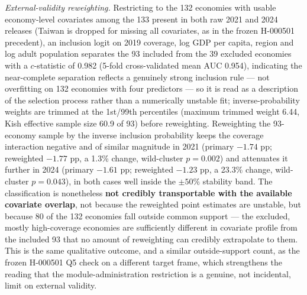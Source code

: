 \emph{External-validity reweighting.} Restricting to the 132 economies with usable
economy-level covariates among the 133 present in both raw 2021 and 2024 releases (Taiwan
is dropped for missing all covariates, as in the frozen H-000501 precedent), an inclusion
logit on 2019 coverage, log GDP per capita, region and log adult population separates the
93 included from the 39 excluded economies with a $c$-statistic of 0.982 (5-fold
cross-validated mean AUC 0.954), indicating the near-complete separation reflects a
genuinely strong inclusion rule --- not overfitting on 132 economies with four
predictors --- so it is read as a description of the selection process rather than a
numerically unstable fit; inverse-probability weights are trimmed at the 1st/99th
percentiles (maximum trimmed weight 6.44, Kish effective sample size 60.9 of 93) before
reweighting. Reweighting the
93-economy sample by the inverse inclusion probability keeps the coverage interaction
negative and of similar magnitude in 2021 (primary $-1.74$ pp; reweighted $-1.77$ pp, a
1.3\% change, wild-cluster $p=0.002$) and attenuates it further in 2024 (primary $-1.61$
pp; reweighted $-1.23$ pp, a 23.3\% change, wild-cluster $p=0.043$), in both cases well
inside the $\pm 50\%$ stability band. The classification is nonetheless
\textbf{not credibly transportable with the available covariate overlap}, not because the
reweighted point estimates are unstable, but
because 80 of the 132 economies fall outside common support --- the excluded, mostly
high-coverage economies are sufficiently different in covariate profile from the included
93 that no amount of reweighting can credibly extrapolate to them. This is the same
qualitative outcome, and a similar outside-support count, as the frozen H-000501 Q5 check
on a different target frame, which strengthens the reading that the module-administration
restriction is a genuine, not incidental, limit on external validity.

